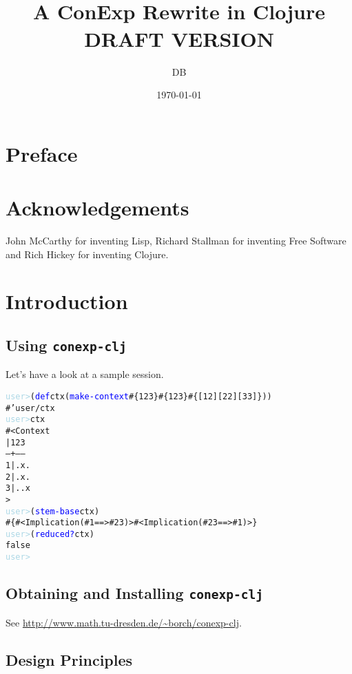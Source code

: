 \documentclass{scrbook}
\title{\conexpclj\\A ConExp Rewrite in Clojure\\[2cm]DRAFT VERSION}
\author{DB}
\date{\today}
\newcommand{\conexpclj}{\texttt{conexp-clj}}
\begin{document}
\maketitle


\chapter*{Preface}

\chapter*{Acknowledgements}

John McCarthy for inventing Lisp, Richard Stallman for inventing Free
Software and Rich Hickey for inventing Clojure.

\tableofcontents


\chapter{Introduction}

  \section{Using \conexpclj}

  Let's have a look at a sample session.

  \newcommand{\spcl}[1]{\textcolor{blue}{#1}}
  \begin{alltt}
    \textcolor{lightblue}{user>} (\spcl{def} ctx (\spcl{make-context} #\{1 2 3\} #\{1 2 3\} #\{[1 2] [2 2] [3 3]\}))
    #'user/ctx
    \textcolor{lightblue}{user>} ctx
    #<Context
      |1 2 3
    --+------
    1 |. x .
    2 |. x .
    3 |. . x
    >
    \textcolor{lightblue}{user>} (\spcl{stem-base} ctx)
    #\{#<Implication ( #{1}  ==>  #{2 3} )> #<Implication ( #{2 3}  ==>  #{1} )>\}
    \textcolor{lightblue}{user>} (\spcl{reduced?} ctx)
    false
    \textcolor{lightblue}{user>}
  \end{alltt}

  \section{Obtaining and Installing \conexpclj}

  See \url{http://www.math.tu-dresden.de/~borch/conexp-clj}.

  \section{Design Principles}
\end{document}
